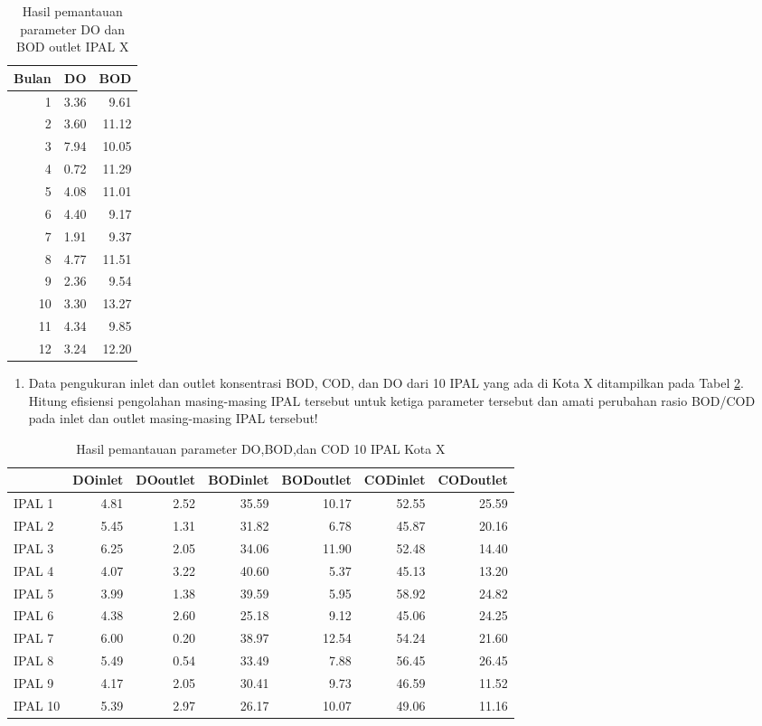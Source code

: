 \documentclass[12pt,]{krantz}
\providecommand{\tightlist}{%
  \setlength{\itemsep}{0pt}\setlength{\parskip}{0pt}}
\begin{document}
\begin{table}

\caption{\label{tab:soal1}Hasil pemantauan parameter DO dan BOD outlet IPAL X}
\centering
\begin{tabular}[t]{r|r|r}
\hline
Bulan & DO & BOD\\
\hline
1 & 3.36 & 9.61\\
\hline
2 & 3.60 & 11.12\\
\hline
3 & 7.94 & 10.05\\
\hline
4 & 0.72 & 11.29\\
\hline
5 & 4.08 & 11.01\\
\hline
6 & 4.40 & 9.17\\
\hline
7 & 1.91 & 9.37\\
\hline
8 & 4.77 & 11.51\\
\hline
9 & 2.36 & 9.54\\
\hline
10 & 3.30 & 13.27\\
\hline
11 & 4.34 & 9.85\\
\hline
12 & 3.24 & 12.20\\
\hline
\end{tabular}
\end{table}

\begin{enumerate}
\def\labelenumi{\arabic{enumi}.}
\setcounter{enumi}{1}
\tightlist
\item
  Data pengukuran inlet dan outlet konsentrasi BOD, COD, dan DO dari 10 IPAL yang ada di Kota X ditampilkan pada Tabel \ref{tab:soal2}. Hitung efisiensi pengolahan masing-masing IPAL tersebut untuk ketiga parameter tersebut dan amati perubahan rasio BOD/COD pada inlet dan outlet masing-masing IPAL tersebut!
\end{enumerate}

\begin{table}

\caption{\label{tab:soal2}Hasil pemantauan parameter DO,BOD,dan COD 10 IPAL Kota X}
\centering
\begin{tabular}[t]{l|r|r|r|r|r|r}
\hline
  & DOinlet & DOoutlet & BODinlet & BODoutlet & CODinlet & CODoutlet\\
\hline
IPAL 1 & 4.81 & 2.52 & 35.59 & 10.17 & 52.55 & 25.59\\
\hline
IPAL 2 & 5.45 & 1.31 & 31.82 & 6.78 & 45.87 & 20.16\\
\hline
IPAL 3 & 6.25 & 2.05 & 34.06 & 11.90 & 52.48 & 14.40\\
\hline
IPAL 4 & 4.07 & 3.22 & 40.60 & 5.37 & 45.13 & 13.20\\
\hline
IPAL 5 & 3.99 & 1.38 & 39.59 & 5.95 & 58.92 & 24.82\\
\hline
IPAL 6 & 4.38 & 2.60 & 25.18 & 9.12 & 45.06 & 24.25\\
\hline
IPAL 7 & 6.00 & 0.20 & 38.97 & 12.54 & 54.24 & 21.60\\
\hline
IPAL 8 & 5.49 & 0.54 & 33.49 & 7.88 & 56.45 & 26.45\\
\hline
IPAL 9 & 4.17 & 2.05 & 30.41 & 9.73 & 46.59 & 11.52\\
\hline
IPAL 10 & 5.39 & 2.97 & 26.17 & 10.07 & 49.06 & 11.16\\
\hline
\end{tabular}
\end{table}
\end{document}
